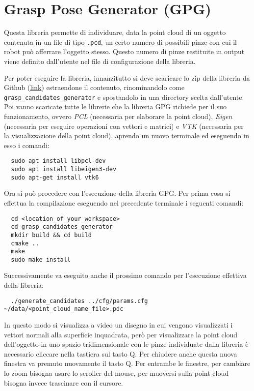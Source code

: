 \documentclass{report}
\begin{document}
\section{Grasp Pose Generator (GPG)}\label{GPG}
Questa libreria permette di individuare, data la point cloud di un oggetto contenuta in un file di tipo \texttt{.pcd}, un certo numero di possibili pinze con cui il robot può afferrare l'oggetto stesso. Questo numero di pinze restituite in output viene definito dall'utente nel file di configurazione della libreria. \par
Per poter eseguire la libreria, innanzitutto si deve scaricare lo zip della libreria da Github (\textcolor{blue}{\underline{\href{https://github.com/atenpas/gpg}{link}}}) estraendone il contenuto, rinominandolo come \texttt{grasp\_candidates\_generator} e spostandolo in una directory scelta dall'utente. Poi vanno scaricate tutte le librerie che la libreria GPG richiede per il suo funzionamento, ovvero \textit{PCL} (necessaria per elaborare la point cloud), \textit{Eigen} (necessaria per eseguire operazioni con vettori e matrici) e \textit{VTK} (necessaria per la visualizzazione della point cloud), aprendo un nuovo terminale ed eseguendo in esso i comandi:
\begin{verbatim}
  sudo apt install libpcl-dev
  sudo apt install libeigen3-dev
  sudo apt-get install vtk6
\end{verbatim}
Ora si può procedere con l'esecuzione della libreria GPG. Per prima cosa si effettua la compilazione eseguendo nel precedente terminale i seguenti comandi:
\begin{verbatim}
  cd <location_of_your_workspace>  
  cd grasp_candidates_generator
  mkdir build && cd build
  cmake ..
  make
  sudo make install
\end{verbatim}
Successivamente va eseguito anche il prossimo comando per l'esecuzione effettiva della libreria:
\begin{verbatim}
  ./generate_candidates ../cfg/params.cfg ~/data/<point_cloud_name_file>.pdc
\end{verbatim}
In questo modo si visualizza a video un disegno in cui vengono visualizzati i vettori normali alla superficie inquadrata, però per visualizzare la point cloud dell'oggetto in uno spazio tridimensionale con le pinze individuate dalla libreria è necessario cliccare nella tastiera sul tasto Q. Per chiudere anche questa nuova finestra va premuto nuovamente il tasto Q. Per entrambe le finestre, per cambiare lo zoom bisogna usare lo scroller del mouse, per muoversi sulla point cloud bisogna invece trascinare con il cursore. 
\end{document}
